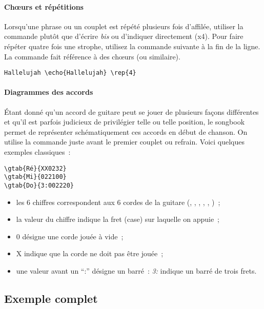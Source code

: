 \documentclass[online]{patacrep}
\begin{document}
\paragraph{Ch\oe{}urs et répétitions}
Lorsqu'une phrase ou un couplet est répété plusieurs fois d'affilée,
utiliser la commande  plutôt que d'écrire \emph{bis} ou
d'indiquer directement (x4). Pour faire répéter quatre fois une
strophe, utilisez la commande suivante à la fin de la ligne. La
commande  fait référence à des chœurs (ou similaire).

\begin{verbatim}
Hallelujah \echo{Hallelujah} \rep{4}
\end{verbatim}


\paragraph{Diagrammes des accords}
Étant donné qu'un accord de guitare peut se jouer de plusieurs façons
différentes et qu'il est parfois judicieux de privilégier telle ou
telle position, le songbook permet de représenter schématiquement ces
accords en début de chanson. On utilise la commande 
juste avant le premier couplet ou refrain. Voici quelques exemples
classiques~:

\begin{verbatim}
\gtab{Ré}{XX0232}
\gtab{Mi}{022100}
\gtab{Do}{3:002220}
\end{verbatim}

\begin{itemize}
\item les 6 chiffres correspondent aux 6 cordes de la guitare
  (, , , ,
  , )~;
\item la valeur du chiffre indique la fret (case) sur laquelle on
  appuie~;
\item 0 désigne une corde jouée à vide~;
\item X indique que la corde ne doit pas être jouée~;
\item une valeur avant un ``:'' désigne un barré~: \emph{3:} indique un
  barré de trois frets.
\end{itemize}

\subsection{Exemple complet}
\end{document}
